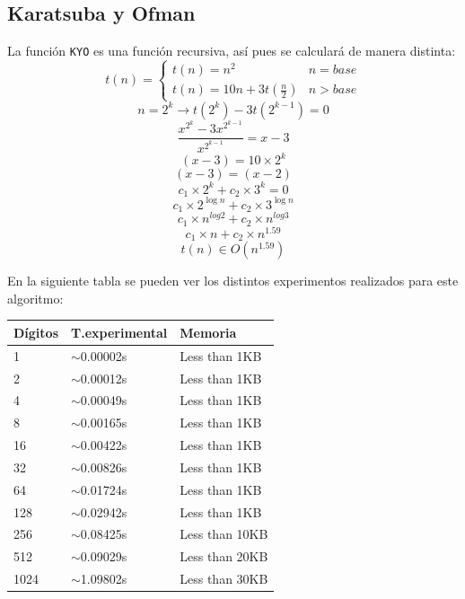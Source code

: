 \documentclass{article}
\begin{document}
\newpage
\subsection{Karatsuba y Ofman}
La función \texttt{KYO} es una función recursiva, así pues se calculará de manera distinta:
$$
	t(n) = \left\{
        \begin{array}{ll}
           	t(n)=n^2 & n=base \\
			t(n)=10n+3t(\frac{n}{2}) & n>base
        \end{array}
    \right.
$$
$$n = 2^k \rightarrow t(2^k)-3t(2^{k-1})=0$$
$$\frac{x^{2^k}-3x^{2^{k-1}}}{x^{2^{k-1}}} = x-3 $$
$$ (x-3)=10 \times 2^k $$
$$ (x-3)=(x-2) $$
$$ c_1\times 2^k+c_2 \times 3^k=0 $$
$$ c_1 \times 2^{\log n}+c_2 \times 3^{\log n} $$
$$ c_1 \times n^{log 2}+c_2 \times n^{log 3} $$
$$ c_1 \times n+c_2 \times n^{1.59} $$
$$ t(n)\in O(n^{1.59}) $$

\begin{center}
En la siguiente tabla se pueden ver los distintos experimentos realizados para este algoritmo: 
\end{center}
\label{kyo-table}
\begin{adjustbox}{width=0.5\textwidth,center=\textwidth}
\begin{tabular}{|l|l|l|}
\hline
{Dígitos} 					   & {T.experimental} 					   	& {Memoria} 					 \\ \hline
1                              & $\sim$0.00002s                        	& Less than 1KB                  \\ \hline
2                              & $\sim$0.00012s                        	& Less than 1KB                  \\ \hline
4                              & $\sim$0.00049s                        	& Less than 1KB                  \\ \hline
8                              & $\sim$0.00165s                        	& Less than 1KB                  \\ \hline
16                             & $\sim$0.00422s                        	& Less than 1KB                  \\ \hline
32                             & $\sim$0.00826s                       	& Less than 1KB                  \\ \hline
64                             & $\sim$0.01724s                      	& Less than 1KB                  \\ \hline
128                            & $\sim$0.02942s                        	& Less than 1KB                  \\ \hline
256                            & $\sim$0.08425s                      	& Less than 10KB                 \\ \hline
512                            & $\sim$0.09029s                      	& Less than 20KB                 \\ \hline
1024                           & $\sim$1.09802s                        	& Less than 30KB                 \\ \hline
\end{tabular}
\end{adjustbox}
\end{document}
